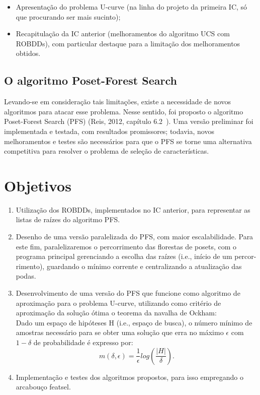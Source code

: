 \documentclass[12pt]{article}
\begin{document}
\begin{itemize}
\item Apresentação do problema U-curve (na linha do projeto da primeira IC, só que
procurando ser mais sucinto);

\item Recapitulação da IC anterior (melhoramentos do algoritmo UCS com ROBDDs), com
particular destaque para a limitação dos melhoramentos obtidos.
\end{itemize}

\subsection{O algoritmo Poset-Forest Search}

Levando-se em consideração tais limitações, existe a necessidade de
novos algoritmos para atacar esse problema. Nesse sentido, foi proposto o 
algoritmo Poset-Forest Search (PFS) (Reis, 2012, capítulo 6.2~\cite{msreis thesis}). Uma versão
preliminar foi implementada e testada, com resultados promissores; todavia,
novos melhoramentos e testes são necessários para que o PFS se torne uma 
alternativa competitiva para resolver o problema de seleção de características.

\section{Objetivos}

\begin{enumerate}
\item Utilização dos ROBDDs, implementados no IC anterior, para representar as 
listas de raízes do algoritmo PFS.

\item Desenho de uma versão paralelizada do PFS, com maior escalabilidade. Para
este fim, paralelizaremos o percorrimento das florestas de posets, com o
programa principal gerenciando a escolha das raízes (i.e., início de um percor-
rimento), guardando o mínimo corrente e centralizando a atualização das podas.

\item Desenvolvimento de uma versão do PFS que funcione como algoritmo de 
aproximação para o problema U-curve, utilizando como critério de aproximação da
solução ótima o teorema da navalha de Ockham:\\
\smallskip
Dado um espaço de hipóteses H (i.e., espaço de busca), o número mínimo de
amostras necessário para se obter uma solução que erra no máximo $\epsilon$ com
$1 - \delta$ de probabilidade é expresso por:
\begin{equation}
\displaystyle  m(\delta,\epsilon) = \frac{1}{\epsilon} log (\frac{|H|}{\delta}).
\end{equation}

\item Implementação e testes dos algoritmos propostos, para isso empregando o 
arcabouço featsel.
\end{enumerate}
\end{document}
